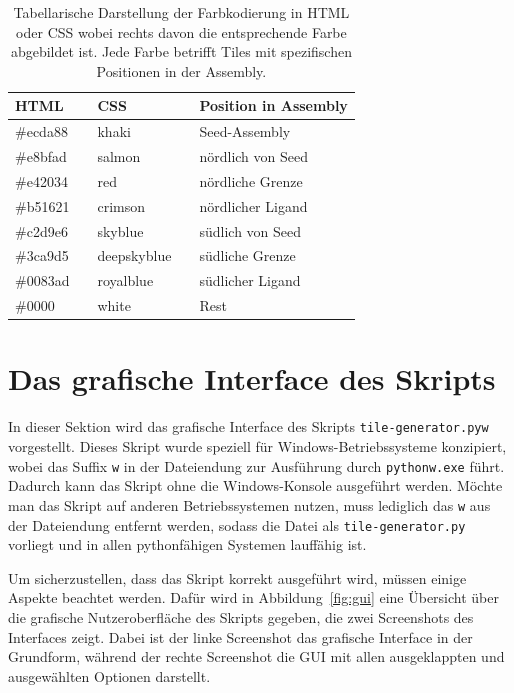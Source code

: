 \begin{table}
    \centering
    \begin{tabular}{lllll}
        \hline
        HTML & & CSS & & Position in Assembly \\\hline
        \#ecda88 & \cellcolor[HTML]{ECDA88} & khaki & \cellcolor[HTML]{F0E68C} & Seed-Assembly \\
        \#e8bfad & \cellcolor[HTML]{E8BFAD} & salmon & \cellcolor[HTML]{FA8072} & nördlich von Seed \\
        \#e42034 & \cellcolor[HTML]{E42034} & red & \cellcolor[HTML]{FF0000} & nördliche Grenze \\
        \#b51621 & \cellcolor[HTML]{B51621} & crimson & \cellcolor[HTML]{DC143C} & nördlicher Ligand \\
        \#c2d9e6 & \cellcolor[HTML]{C2D9E6} & skyblue & \cellcolor[HTML]{87CEEB} & südlich von Seed \\
        \#3ca9d5 & \cellcolor[HTML]{3CA9D5} & deepskyblue & \cellcolor[HTML]{00BFFF} & südliche Grenze \\
        \#0083ad & \cellcolor[HTML]{0083AD} & royalblue & \cellcolor[HTML]{4169E1} & südlicher Ligand \\
        \#0000 & & white & & Rest \\\hline
    \end{tabular}
    \caption[Farbschema der Tilesets]{Tabellarische Darstellung der Farbkodierung in HTML oder CSS wobei rechts davon die entsprechende Farbe abgebildet ist. Jede Farbe betrifft Tiles mit spezifischen Positionen in der Assembly.}
    \label{tab:farbkodierung}
\end{table}

\section{Das grafische Interface des Skripts}

In dieser Sektion wird das grafische Interface des Skripts \texttt{tile-generator.pyw} vorgestellt. Dieses Skript wurde speziell für Windows-Betriebssysteme konzipiert, wobei das Suffix \texttt{w} in der Dateiendung zur Ausführung durch \texttt{pythonw.exe} führt. Dadurch kann das Skript ohne die Windows-Konsole ausgeführt werden. Möchte man das Skript auf anderen Betriebssystemen nutzen, muss lediglich das \texttt{w} aus der Dateiendung entfernt werden, sodass die Datei als \texttt{tile-generator.py} vorliegt und in allen pythonfähigen Systemen lauffähig ist. 

Um sicherzustellen, dass das Skript korrekt ausgeführt wird, müssen einige Aspekte beachtet werden. Dafür wird in Abbildung~\ref{fig:gui} eine Übersicht über die grafische Nutzeroberfläche des Skripts gegeben, die zwei Screenshots des Interfaces zeigt. Dabei ist der linke Screenshot das grafische Interface in der Grundform, während der rechte Screenshot die GUI mit allen ausgeklappten und ausgewählten Optionen darstellt.

